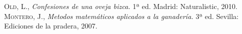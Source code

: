 \begin{thebibliography}{aaaa}
 \textsc{Old, L.},
\textit{Confesiones de una oveja bizca.}
1ª ed. Madrid: Naturalistic, 2010. 
 \textsc{Montero, J.},
\textit{Metodos matemáticos aplicados a la ganadería.}
3ª ed. Sevilla: Ediciones de la pradera, 2007.  
\end{thebibliography}